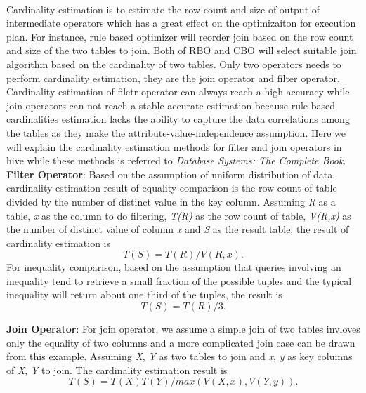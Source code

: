             \paragraph{}
            Cardinality estimation is to estimate the row count and size of output of intermediate operators which has a great
            effect on the optimizaiton for execution plan. For instance, rule based optimizer will reorder join based on the 
            row count and size of the two tables to join. Both of RBO and CBO will select suitable join algorithm based on 
            the cardinality of two tables. Only two operators needs to perform cardinality estimation, they are the
            join operator and filter operator. Cardinality estimation of filetr operator can always reach a high accuracy 
            while join operators can not reach a stable accurate estimation because rule based cardinalities estimation lacks 
            the ability to capture the data correlations among the tables as they make the attribute-value-independence 
            assumption. Here we will explain the cardinality estimation methods for filter and join operators in hive while
            these methods is referred to \textit{Database Systems: The Complete Book}\cite{DatabaseSystems}.\\

            \textbf{Filter Operator}: Based on the assumption of uniform distribution of data\cite{DatabaseSystems}, cardinality 
            estimation result of equality comparison is the row count of table divided by the number of distinct value in the key 
            column. Assuming \textit{R} as a table, \textit{x} as the column to do filtering, \textit{T(R)} as the row count of 
            table, \textit{V(R,x)} as the number of distinct value of column \textit{x} and \textit{S} as the result table, 
            the result of cardinality estimation is $$T(S) = T(R) / V(R,x).$$For inequality comparison, based on the assumption
            that queries involving an inequality tend to retrieve a small fraction of the possible tuples and the typical
            inequality will return about one third of the tuples\cite{DatabaseSystems}, the result is $$T(S) = T(R) / 3.$$   
            
            \textbf{Join Operator}: For join operator, we assume a simple join of two tables invloves only the equality of two 
            columns and a more complicated join case can be drawn from this example. Assuming \textit{X}, \textit{Y} as two tables
            to join and \textit{x}, \textit{y} as key columns of \textit{X}, \textit{Y} to join. The cardinality estimation result
            is $$T(S) = T(X)T(Y) / max(V(X,x), V(Y,y)).$$
